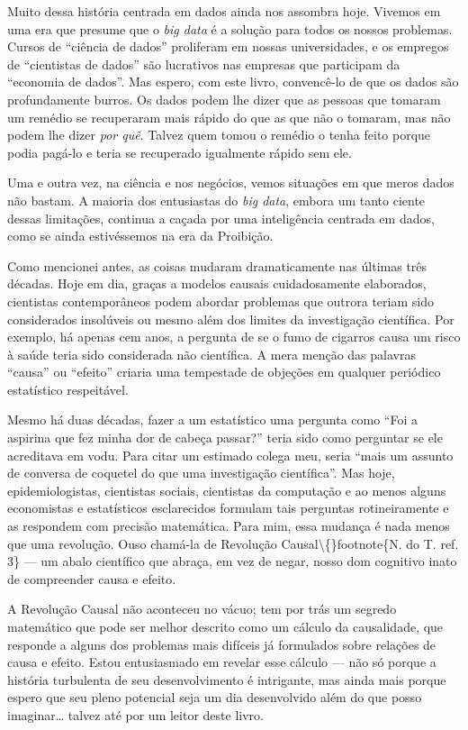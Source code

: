 \documentclass[11pt,a5paper,twoside]{book}
\begin{document}
Muito dessa história centrada em dados ainda nos assombra hoje. Vivemos em uma era que presume que o \textit{big data} é a solução para todos os nossos problemas. Cursos de “ciência de dados” proliferam em nossas universidades, e os empregos de “cientistas de dados” são lucrativos nas empresas que participam da “economia de dados”. Mas espero, com este livro, convencê-lo de que os dados são profundamente burros. Os dados podem lhe dizer que as pessoas que tomaram um remédio se recuperaram mais rápido do que as que não o tomaram, mas não podem lhe dizer \textit{por quê}. Talvez quem tomou o remédio o tenha feito porque podia pagá-lo e teria se recuperado igualmente rápido sem ele.

Uma e outra vez, na ciência e nos negócios, vemos situações em que meros dados não bastam. A maioria dos entusiastas do \textit{big data}, embora um tanto ciente dessas limitações, continua a caçada por uma inteligência centrada em dados, como se ainda estivéssemos na era da Proibição.

Como mencionei antes, as coisas mudaram dramaticamente nas últimas três décadas. Hoje em dia, graças a modelos causais cuidadosamente elaborados, cientistas contemporâneos podem abordar problemas que outrora teriam sido considerados insolúveis ou mesmo além dos limites da investigação científica. Por exemplo, há apenas cem anos, a pergunta de se o fumo de cigarros causa um risco à saúde teria sido considerada não científica. A mera menção das palavras “causa” ou “efeito” criaria uma tempestade de objeções em qualquer periódico estatístico respeitável.

Mesmo há duas décadas, fazer a um estatístico uma pergunta como “Foi a aspirina que fez minha dor de cabeça passar?” teria sido como perguntar se ele acreditava em vodu. Para citar um estimado colega meu, seria “mais um assunto de conversa de coquetel do que uma investigação científica”. Mas hoje, epidemiologistas, cientistas sociais, cientistas da computação e ao menos alguns economistas e estatísticos esclarecidos formulam tais perguntas rotineiramente e as respondem com precisão matemática. Para mim, essa mudança é nada menos que uma revolução. Ouso chamá-la de Revolução Causal\textbackslash\{\}footnote\{N. do T. ref. 3\} — um abalo científico que abraça, em vez de negar, nosso dom cognitivo inato de compreender causa e efeito.

A Revolução Causal não aconteceu no vácuo; tem por trás um segredo matemático que pode ser melhor descrito como um cálculo da causalidade, que responde a alguns dos problemas mais difíceis já formulados sobre relações de causa e efeito. Estou entusiasmado em revelar esse cálculo — não só porque a história turbulenta de seu desenvolvimento é intrigante, mas ainda mais porque espero que seu pleno potencial seja um dia desenvolvido além do que posso imaginar… talvez até por um leitor deste livro.
\end{document}
